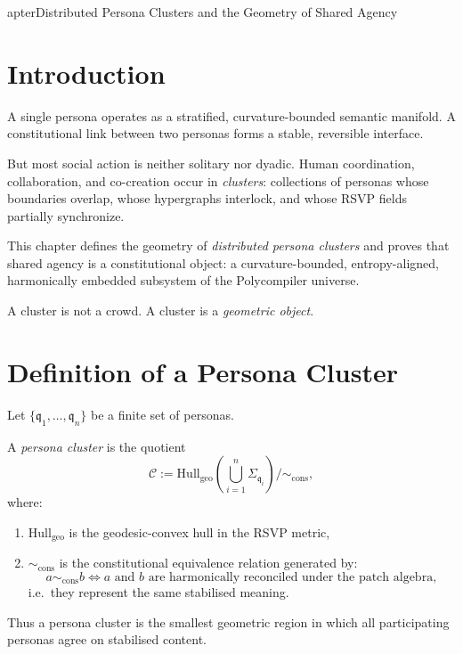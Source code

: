 apter{Distributed Persona Clusters and the Geometry of Shared Agency}
\label{ch:distributed-persona-clusters}

\section{Introduction}

A single persona operates as a stratified, curvature-bounded semantic manifold.
A constitutional link between two personas forms a stable, reversible interface.

But most social action is neither solitary nor dyadic.
Human coordination, collaboration, and co-creation occur in 
\emph{clusters}:
collections of personas whose boundaries overlap, whose hypergraphs interlock,
and whose RSVP fields partially synchronize.

This chapter defines the geometry of \emph{distributed persona clusters} and proves that
shared agency is a constitutional object:  
a curvature-bounded, entropy-aligned, harmonically embedded subsystem of the
Polycompiler universe.

A cluster is not a crowd.  
A cluster is a \emph{geometric object}.


\section{Definition of a Persona Cluster}

Let $\{\mathfrak{q}_1,\dots,\mathfrak{q}_n\}$ be a finite set of personas.

\begin{definition}
A \emph{persona cluster} is the quotient
\[
\mathcal{C}
:= 
\mathrm{Hull}_{\mathrm{geo}}
\!\left(
\bigcup_{i=1}^n \Sigma_{\mathfrak{q}_i}
\right)
\bigg/
\!\sim_{\mathrm{cons}},
\]
where:
\begin{enumerate}
    \item $\mathrm{Hull}_{\mathrm{geo}}$ is the geodesic-convex hull in the RSVP metric,
    \item $\sim_{\mathrm{cons}}$ is the constitutional equivalence relation generated by:
    \[
    a \sim_{\mathrm{cons}} b
    \iff
    \text{$a$ and $b$ are harmonically reconciled under the patch algebra},
    \]
    i.e.\ they represent the same stabilised meaning.
\end{enumerate}
\end{definition}

Thus a persona cluster is the smallest geometric region in which all participating 
personas agree on stabilised content.


